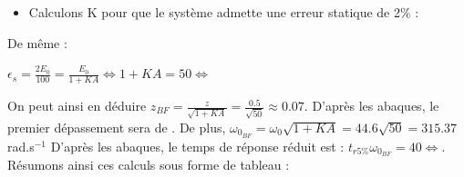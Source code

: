 \documentclass[12pt]{article}
\begin{document}
\begin{itemize}
    \item Calculons K pour que le système admette une erreur statique de 2$\%$ : 
\end{itemize}
De même : 
\begin{center}
    $\epsilon_s = \frac{2E_0}{100} = \frac{E_0}{1 + KA} \Leftrightarrow 1 + KA = 50 \Leftrightarrow$ 
\end{center}
On peut ainsi en déduire $z_{BF} = \frac{z}{\sqrt{1 + KA}} = \frac{0.5}{\sqrt{50}} \approx 0.07$. D'après les abaques, le premier dépassement sera de .
De plus, $\omega_{0_{BF}} = \omega_0\sqrt{1 + KA} = 44.6\sqrt{50} = 315.37$ rad.s$^{-1}$
D'après les abaques, le temps de réponse réduit est : $t_{r5\%}\omega_{0_{BF}} = 40 \Leftrightarrow $.
\normalsize Résumons ainsi ces calculs sous forme de tableau : 
\end{document}
